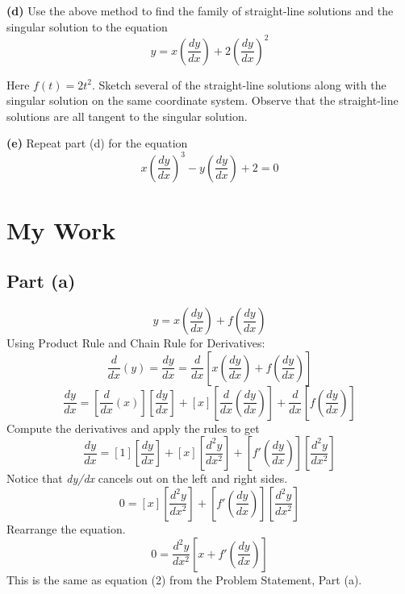 \documentclass{article}
\begin{document}
\noindent\textbf{(d)} Use the above method to find the family of straight-line solutions and the singular solution to the equation
\begin{equation}
y = x(\frac{dy}{dx}) + 2(\frac{dy}{dx})^2
\end{equation}

\noindent Here $\mathit{f(t) = 2t^2.}$ Sketch several of the straight-line solutions along with the singular solution on the same coordinate system. Observe that the straight-line solutions are all tangent to the singular solution.\newline

\noindent\textbf{(e)} Repeat part (d) for the equation
\begin{equation}
x (\frac{dy}{dx})^3 - y(\frac{dy}{dx}) + 2 = 0
\end{equation}

\section{My Work}
\subsection{Part (a)}
\begin{equation}
y = x(\frac{dy}{dx}) + f(\frac{dy}{dx})
\end{equation}
Using Product Rule and Chain Rule for Derivatives:
\begin{equation}
\frac{d}{dx}(y) = \frac{dy}{dx} = \frac{d}{dx}[x(\frac{dy}{dx}) + f(\frac{dy}{dx})]
\end{equation}
\begin{equation}
\frac{dy}{dx} = [\frac{d}{dx}(x)][\frac{dy}{dx}] + [x][\frac{d}{dx}(\frac{dy}{dx})] + \frac{d}{dx}[f(\frac{dy}{dx})]
\end{equation}
Compute the derivatives and apply the rules to get
\begin{equation}
\frac{dy}{dx} = [1][\frac{dy}{dx}] + [x][\frac{d^2y}{dx^2}] + [f'(\frac{dy}{dx})][\frac{d^2y}{dx^2}]
\end{equation}
Notice that \textit{dy/dx} cancels out on the left and right sides.
\begin{equation}
0 = [x][\frac{d^2y}{dx^2}] + [f'(\frac{dy}{dx})][\frac{d^2y}{dx^2}]
\end{equation}
Rearrange the equation.
\begin{equation}
0 = \frac{d^2y}{dx^2}[x + f'(\frac{dy}{dx})]
\end{equation}
This is the same as equation (2) from the Problem Statement, Part (a).
\end{document}

